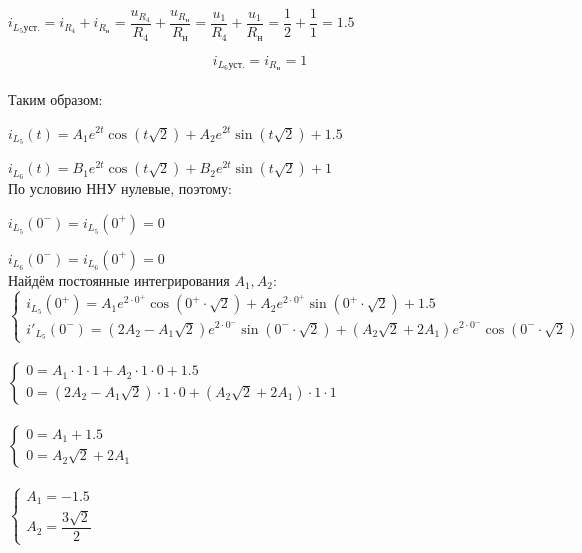 $ i_{L_5 уст.} = 
i_{R_4} + i_{R_н} = 
\dfrac{u_{R_4}}{R_4} + \dfrac{u_{R_н}}{R_н} = 
\dfrac{u_1}{R_4} + \dfrac{u_1}{R_н} = 
\dfrac{1}{2} + \dfrac{1}{1} = 1.5
$

\begin{equation}\label{eq:i_L_6_}
i_{L_6 уст.} = i_{R_н} = 1
\end{equation}\\

Таким образом:

$ i_{L_5}(t) = 
A_1 e^{2t} \cos(t\sqrt{2}) + 
A_2 e^{2t} \sin(t\sqrt{2}) +
1.5
$

$ i_{L_6}(t) = 
B_1 e^{2t} \cos(t\sqrt{2}) + 
B_2 e^{2t} \sin(t\sqrt{2}) + 
1
$\\

По условию ННУ нулевые, поэтому:

$ i_{L_5}(0^-) = i_{L_5}(0^+) = 0 $

$ i_{L_6}(0^-) = i_{L_6}(0^+) = 0 $\\

Найдём постоянные интегрирования $ A_1, A_2 $:\\

$ \begin{cases}
    i_{L_5}(0^+) = 
    A_1 e^{2 \cdot 0^+} \cos(0^+ \cdot \sqrt{2}) + 
    A_2 e^{2 \cdot 0^+} \sin(0^+ \cdot \sqrt{2}) + 
    1.5\\
    i'_{L_5}(0^-) = 
    (2 A_2 - A_1 \sqrt{2}) e^{2 \cdot 0^-} \sin(0^- \cdot \sqrt{2}) +
    (A_2 \sqrt{2} + 2 A_1) e^{2 \cdot 0^-} \cos(0^- \cdot \sqrt{2})
\end{cases} $\\\\

$ \begin{cases}
    0 = A_1 \cdot 1 \cdot 1 + A_2 \cdot 1 \cdot 0 + 1.5\\
    0 = (2 A_2 - A_1 \sqrt{2}) \cdot 1 \cdot 0 + (A_2 \sqrt{2} + 2 A_1) \cdot 1 \cdot 1
\end{cases} $\\\\

$ \begin{cases}
    0 = A_1 + 1.5\\
    0 = A_2 \sqrt{2} + 2 A_1
\end{cases} $\\\\

$ \begin{cases}
    A_1 = - 1.5\\
    A_2 = \dfrac{3\sqrt{2}}{2}
\end{cases} $\\\\

